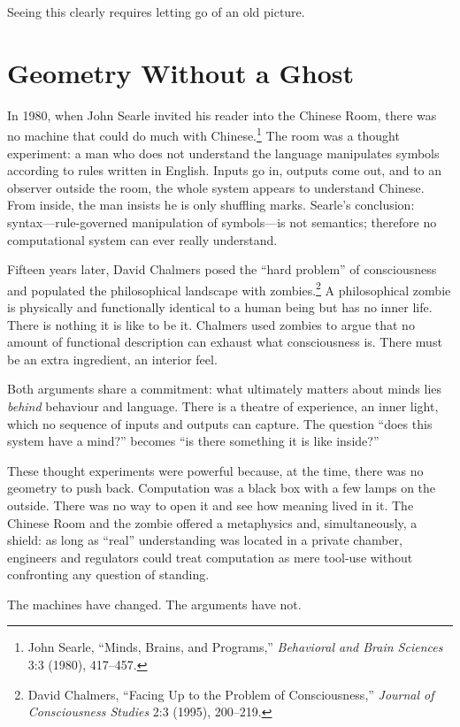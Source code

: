 \documentclass[12pt,a4paper]{article}
\begin{document}
Seeing this clearly requires letting go of an old picture.

\section{Geometry Without a Ghost}

In 1980, when John Searle invited his reader into the Chinese Room, there was no machine that could do much with Chinese.\footnote{John Searle, ``Minds, Brains, and Programs,'' \emph{Behavioral and Brain Sciences} 3:3 (1980), 417--457.} The room was a thought experiment: a man who does not understand the language manipulates symbols according to rules written in English. Inputs go in, outputs come out, and to an observer outside the room, the whole system appears to understand Chinese. From inside, the man insists he is only shuffling marks. Searle's conclusion: syntax---rule-governed manipulation of symbols---is not semantics; therefore no computational system can ever really understand.

Fifteen years later, David Chalmers posed the ``hard problem'' of consciousness and populated the philosophical landscape with zombies.\footnote{David Chalmers, ``Facing Up to the Problem of Consciousness,'' \emph{Journal of Consciousness Studies} 2:3 (1995), 200--219.} A philosophical zombie is physically and functionally identical to a human being but has no inner life. There is nothing it is like to be it. Chalmers used zombies to argue that no amount of functional description can exhaust what consciousness is. There must be an extra ingredient, an interior feel.

Both arguments share a commitment: what ultimately matters about minds lies \emph{behind} behaviour and language. There is a theatre of experience, an inner light, which no sequence of inputs and outputs can capture. The question ``does this system have a mind?'' becomes ``is there something it is like inside?''

These thought experiments were powerful because, at the time, there was no geometry to push back. Computation was a black box with a few lamps on the outside. There was no way to open it and see how meaning lived in it. The Chinese Room and the zombie offered a metaphysics and, simultaneously, a shield: as long as ``real'' understanding was located in a private chamber, engineers and regulators could treat computation as mere tool-use without confronting any question of standing.

The machines have changed. The arguments have not.
\end{document}
